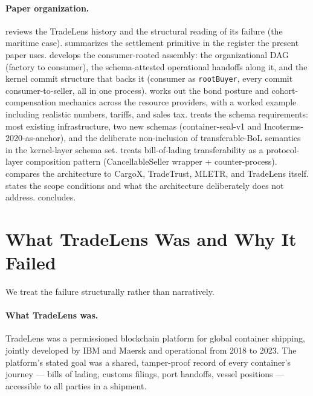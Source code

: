 \documentclass[11pt,a4paper]{article}
\theoremstyle{definition}
\theoremstyle{remark}
\begin{document}
\paragraph{Paper organization.}
 reviews the TradeLens history and the
structural reading of its failure (the maritime case).
 summarizes the settlement primitive in the
register the present paper uses.
 develops the consumer-rooted assembly: the
organizational DAG (factory to consumer), the schema-attested
operational handoffs along it, and the kernel commit structure
that backs it (consumer as \texttt{rootBuyer}, every commit
consumer-to-seller, all in one process).
 works out the bond posture and cohort-compensation
mechanics across the resource providers, with a worked example
including realistic numbers, tariffs, and sales tax.
 treats the schema requirements: most existing
infrastructure, two new schemas (container-seal-v1 and
Incoterms-2020-as-anchor), and the deliberate non-inclusion of
transferable-BoL semantics in the kernel-layer schema set.
 treats bill-of-lading transferability as a
protocol-layer composition pattern (CancellableSeller wrapper +
counter-process).
 compares the architecture to CargoX,
TradeTrust, MLETR, and TradeLens itself.
 states the scope conditions and what the
architecture deliberately does not address.
 concludes.

\section{What TradeLens Was and Why It Failed}
\label{sec:tradelens}

We treat the failure structurally rather than narratively.

\paragraph{What TradeLens was.}
TradeLens was a permissioned blockchain platform for global
container shipping, jointly developed by IBM and Maersk and
operational from 2018 to 2023. The platform's stated goal was a
shared, tamper-proof record of every container's journey ---
bills of lading, customs filings, port handoffs, vessel positions
--- accessible to all parties in a shipment.
\end{document}
